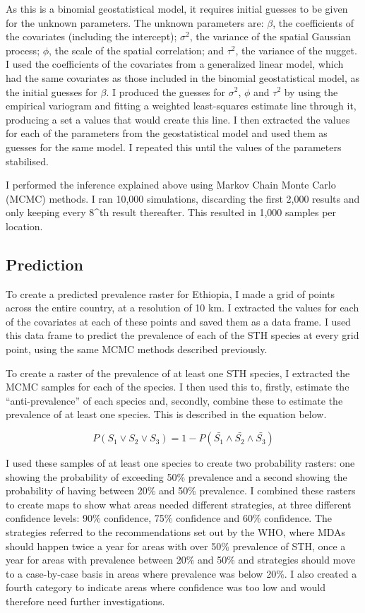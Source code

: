 \documentclass[
]{article}
\begin{document}
As this is a binomial geostatistical model, it requires initial guesses
to be given for the unknown parameters. The unknown parameters are:
\(\beta\), the coefficients of the covariates (including the intercept);
\(\sigma^2\), the variance of the spatial Gaussian process; \(\phi\),
the scale of the spatial correlation; and \(\tau^2\), the variance of
the nugget. I used the coefficients of the covariates from a generalized
linear model, which had the same covariates as those included in the
binomial geostatistical model, as the initial guesses for \(\beta\). I
produced the guesses for \(\sigma^2\), \(\phi\) and \(\tau^2\) by using
the empirical variogram and fitting a weighted least-squares estimate
line through it, producing a set a values that would create this line. I
then extracted the values for each of the parameters from the
geostatistical model and used them as guesses for the same model. I
repeated this until the values of the parameters stabilised.

I performed the inference explained above using Markov Chain Monte Carlo
(MCMC) methods. I ran 10,000 simulations, discarding the first 2,000
results and only keeping every 8\^{}th result thereafter. This resulted
in 1,000 samples per location.

\hypertarget{prediction}{%
\subsection{Prediction}\label{prediction}}

To create a predicted prevalence raster for Ethiopia, I made a grid of
points across the entire country, at a resolution of 10 km. I extracted
the values for each of the covariates at each of these points and saved
them as a data frame. I used this data frame to predict the prevalence
of each of the STH species at every grid point, using the same MCMC
methods described previously.

To create a raster of the prevalence of at least one STH species, I
extracted the MCMC samples for each of the species. I then used this to,
firstly, estimate the ``anti-prevalence'' of each species and, secondly,
combine these to estimate the prevalence of at least one species. This
is described in the equation below.

\[ P(S_1 \vee S_2 \vee S_3) = 1 - P(\bar{S_1} \wedge \bar{S_2} \wedge \bar{S_3}) \]

I used these samples of at least one species to create two probability
rasters: one showing the probability of exceeding 50\% prevalence and a
second showing the probability of having between 20\% and 50\%
prevalence. I combined these rasters to create maps to show what areas
needed different strategies, at three different confidence levels: 90\%
confidence, 75\% confidence and 60\% confidence. The strategies referred
to the recommendations set out by the WHO, where MDAs should happen
twice a year for areas with over 50\% prevalence of STH, once a year for
areas with prevalence between 20\% and 50\% and strategies should move
to a case-by-case basis in areas where prevalence was below 20\%. I also
created a fourth category to indicate areas where confidence was too low
and would therefore need further investigations.
\end{document}

